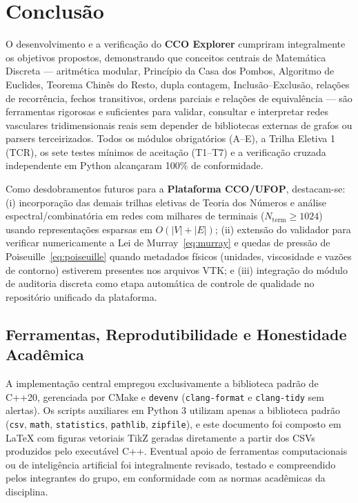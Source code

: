 \documentclass[11pt, a4paper]{article}
\begin{document}
\section{Conclusão}

O desenvolvimento e a verificação do \textbf{CCO Explorer} cumpriram integralmente os objetivos propostos, demonstrando que conceitos centrais de Matemática Discreta --- aritmética modular, Princípio da Casa dos Pombos, Algoritmo de Euclides, Teorema Chinês do Resto, dupla contagem, Inclusão--Exclusão, relações de recorrência, fechos transitivos, ordens parciais e relações de equivalência --- são ferramentas rigorosas e suficientes para validar, consultar e interpretar redes vasculares tridimensionais reais sem depender de bibliotecas externas de grafos ou parsers terceirizados. Todos os módulos obrigatórios (A--E), a Trilha Eletiva 1 (TCR), os sete testes mínimos de aceitação (T1--T7) e a verificação cruzada independente em Python alcançaram 100\% de conformidade.

Como desdobramentos futuros para a \textbf{Plataforma CCO/UFOP}, destacam-se: (i) incorporação das demais trilhas eletivas de Teoria dos Números e análise espectral/combinatória em redes com milhares de terminais ($N_{\mathrm{term}} \ge 1024$) usando representações esparsas em $O(|V| + |E|)$; (ii) extensão do validador para verificar numericamente a Lei de Murray~\eqref{eq:murray} e quedas de pressão de Poiseuille~\eqref{eq:poiseuille} quando metadados físicos (unidades, viscosidade e vazões de contorno) estiverem presentes nos arquivos VTK; e (iii) integração do módulo de auditoria discreta como etapa automática de controle de qualidade no repositório unificado da plataforma.

\subsection*{Ferramentas, Reprodutibilidade e Honestidade Acadêmica}
A implementação central empregou exclusivamente a biblioteca padrão de C++20, gerenciada por CMake e \texttt{devenv} (\texttt{clang-format} e \texttt{clang-tidy} sem alertas). Os scripts auxiliares em Python 3 utilizam apenas a biblioteca padrão (\texttt{csv}, \texttt{math}, \texttt{statistics}, \texttt{pathlib}, \texttt{zipfile}), e este documento foi composto em \LaTeX{} com figuras vetoriais TikZ geradas diretamente a partir dos CSVs produzidos pelo executável C++. Eventual apoio de ferramentas computacionais ou de inteligência artificial foi integralmente revisado, testado e compreendido pelos integrantes do grupo, em conformidade com as normas acadêmicas da disciplina.
\end{document}
